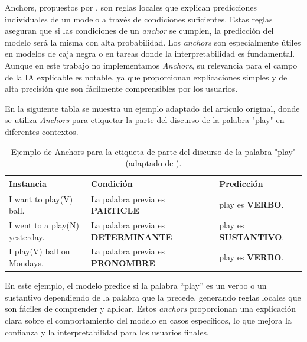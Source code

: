 Anchors, propuestos por \textcite{ribeiro2018anchors}, son reglas locales que explican predicciones individuales de un modelo a través de condiciones suficientes. Estas reglas aseguran que si las condiciones de un \textit{anchor} se cumplen, la predicción del modelo será la misma con alta probabilidad. Los \textit{anchors} son especialmente útiles en modelos de caja negra o en tareas donde la interpretabilidad es fundamental. Aunque en este trabajo no implementamos \textit{Anchors}, su relevancia para el campo de la IA explicable es notable, ya que proporcionan explicaciones simples y de alta precisión que son fácilmente comprensibles por los usuarios.

En la siguiente tabla se muestra un ejemplo adaptado del artículo original, donde se utiliza \textit{Anchors} para etiquetar la parte del discurso de la palabra "play" en diferentes contextos.

\begin{table}[H]
    \centering
    \scriptsize %
    \renewcommand{\arraystretch}{1.5} %
    \begin{tabular}{p{4cm} p{5.5cm} p{3.2cm}}
        \toprule
        \textbf{Instancia} & \textbf{Condición} & \textbf{Predicción} \\
        \midrule
        I want to play(V) ball. & La palabra previa es \textbf{PARTICLE} & play es \textbf{VERBO}. \\ 
        I went to a play(N) yesterday. & La palabra previa es \textbf{DETERMINANTE} & play es \textbf{SUSTANTIVO}. \\ 
        I play(V) ball on Mondays. & La palabra previa es \textbf{PRONOMBRE} & play es \textbf{VERBO}. \\
        \bottomrule
    \end{tabular}
    \caption{Ejemplo de Anchors para la etiqueta de parte del discurso de la palabra "play" (adaptado de \textcite{ribeiro2018anchors}).}
    \label{tab:anchors-pos}
\end{table}


\noindent
En este ejemplo, el modelo predice si la palabra ``play'' es un verbo o un sustantivo dependiendo de la palabra que la precede, generando reglas locales que son fáciles de comprender y aplicar. Estos \textit{anchors} proporcionan una explicación clara sobre el comportamiento del modelo en casos específicos, lo que mejora la confianza y la interpretabilidad para los usuarios finales.



